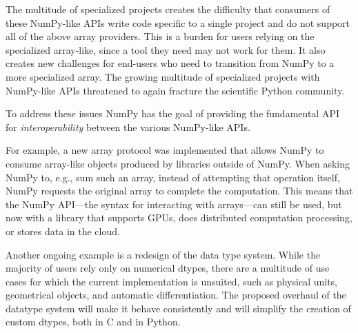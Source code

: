 
The multitude of specialized projects creates the difficulty that consumers
of these NumPy-like APIs write code specific to a single project and do not support
all of the above array providers.
This is a burden for users relying on the specialized array-like, since
a tool they need may not work for them.
It also creates new challenges for end-users who need to transition
from NumPy to a more specialized array.
The growing multitude of specialized projects with NumPy-like APIs threatened
to again fracture the scientific Python community.


To address these issues NumPy has the goal of providing the fundamental
API for \emph{interoperability} between the various NumPy-like APIs.

For example, a new array protocol was implemented that allows NumPy to consume
array-like objects produced by libraries outside of NumPy.  When asking NumPy
to, e.g., sum such an array, instead of attempting that operation itself, NumPy
requests the original array to complete the computation.  This means that the
NumPy API---the syntax for interacting with arrays---can still be used, but now
with a library that supports GPUs, does distributed computation processing, or
stores data in the cloud.

Another ongoing example is a redesign of the data type system.
While the majority of users rely only on numerical dtypes, there are a
multitude of use cases for which the current implementation is unsuited, such
as physical units\cite{astropy,Goldbaum2018,pint}, geometrical
objects\cite{pygeos}, and automatic differentiation\cite{pyadolc}.
The proposed overhaul of the datatype system will make it behave consistently
and will simplify the creation of custom dtypes, both in C and in Python.



